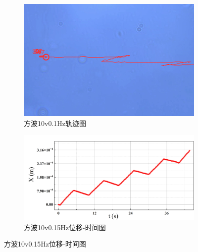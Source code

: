 \documentclass[a4paper]{report} %
\begin{document}
\begin{figure}[H]
    \begin{subfigure}{0.25\textwidth}
        \includegraphics[width=\linewidth]{10v0.1Hz.png}
        \caption{方波10v0.1Hz轨迹图}
    \end{subfigure}
    \begin{subfigure}{0.45\textwidth}
        \includegraphics[width=\linewidth]{10v0.1Hz1.png}
        \caption{方波10v0.15Hz位移-时间图}
    \end{subfigure}


\end{figure}
\end{document}

